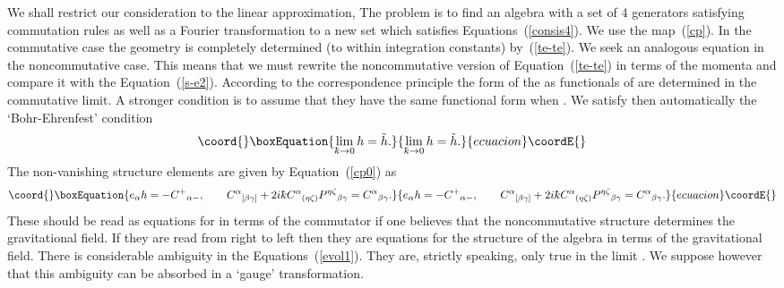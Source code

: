 \documentclass[12pt,a4paper]{article}
\newcounter{eg}
\def\t#1{\tilde #1}
\def\kbar{{\mathchar'26\mkern-9muk}}
\begin{document}
We shall restrict our consideration to the linear approximation, The
problem is to find an algebra with a set of 4 generators \coordHE{}
satisfying commutation rules as well as a Fourier transformation to a
new set \myHighlight{$\lambda_\alpha$}\coordHE{} which satisfies Equations~(\ref{consis4}).
We use the map~(\ref{cp}). In the commutative case the geometry is
completely determined (to within integration constants)
by~(\ref{te-te}). We seek an analogous equation in the noncommutative
case. This means that we must rewrite the noncommutative version
of Equation~(\ref{te-te}) in terms of the momenta and compare it with the
Equation~(\ref{s-e2}).  According to the correspondence principle
the form of the \coordHE{} as functionals of \coordHE{} are
determined in the commutative limit. A stronger condition is to assume
that they have the same functional form when \myHighlight{$\kbar \neq 0$}\coordHE{}. We
satisfy then automatically the `Bohr-Ehrenfest' condition
\begin{equation}\coord{}\boxEquation{
\lim_{\kbar\to 0} h = \t{h}.
}{
\lim_{\kbar\to 0} h = \t{h}.
}{ecuacion}\coordE{}\end{equation}
The non-vanishing structure elements are given by
Equation~(\ref{cp0}) as 
\begin{equation}\coord{}\boxEquation{
e_\alpha h = - C^+{}_{\alpha -}, \qquad
C^\alpha{}_{[\beta\gamma]} + 2i\kbar 
C^\alpha{}_{(\eta\zeta)} P^{\eta\zeta}{}_{\beta\gamma} =
C^\alpha{}_{\beta\gamma}.                              \label{evol1}
}{
e_\alpha h = - C^+{}_{\alpha -}, \qquad
C^\alpha{}_{[\beta\gamma]} + 2i\kbar 
C^\alpha{}_{(\eta\zeta)} P^{\eta\zeta}{}_{\beta\gamma} =
C^\alpha{}_{\beta\gamma}.                              }{ecuacion}\coordE{}\end{equation}
These should be read as equations for \coordHE{} in terms of the commutator
\coordHE{} if one believes that the noncommutative
structure determines the gravitational field. If they are read from
right to left then they are equations for the structure of the algebra
in terms of the gravitational field. There is considerable ambiguity
in the Equations~(\ref{evol1}). They are, strictly speaking, only true
in the limit \myHighlight{$\kbar\to 0$}\coordHE{}. We suppose however that this ambiguity can
be absorbed in a `gauge' transformation.
\end{document}

